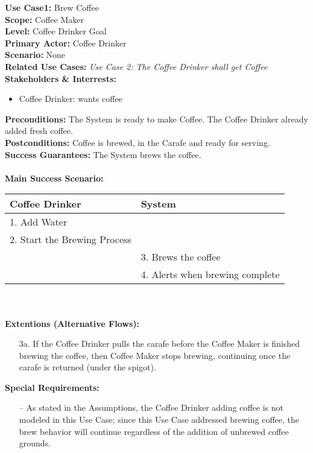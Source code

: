 \documentclass[letterpaper]{article}
\begin{document}
\noindent
\textbf{Use Case1: }Brew Coffee\\
\textbf{Scope: }Coffee Maker\\
\textbf{Level: }Coffee Drinker Goal\\
\textbf{Primary Actor: }Coffee Drinker\\
\textbf{Scenario: }None\\
\textbf{Related Use Cases: }\textit{Use Case 2:  The Coffee Drinker
shall get Coffee}\\
\textbf{Stakeholders \& Interrests: }
\begin{itemize}
\item Coffee Drinker: wants coffee
\end{itemize}
\textbf{Preconditions: }The System is ready to make Coffee.  The
Coffee Drinker already added fresh coffee.\\
\textbf{Postconditions: }Coffee is brewed, in the Carafe and ready for
serving.\\
\textbf{Success Guarantees: }The System brews the coffee.\\\\
\textbf{Main Success Scenario: }\\
\begin{tabular}{|p{5.75cm}|p{5.75cm}|}\hline
\textbf{Coffee Drinker} & \textbf{System}\\\hline
1.  Add Water & \\\hline
2.  Start the Brewing Process &\\\hline
& 3. Brews the coffee\\\hline
& 4. Alerts when brewing complete\\\hline
\end{tabular}\\\\
\textbf{Extentions (Alternative Flows): }
\begin{itemize}
\item[3a.]
If the Coffee Drinker pulls the carafe before the Coffee Maker
is finished brewing the coffee, then Coffee Maker stops brewing,
continuing once the carafe is returned (under the spigot).
\end{itemize}
\textbf{Special Requirements:  }
\begin{itemize}
\item [--]As stated in the Assumptions, the Coffee Drinker adding
coffee
is not modeled in this Use Case; since this Use Case addressed brewing
coffee, the brew behavior will continue regardless of the addition of
unbrewed coffee grounds.
\end{itemize}
\end{document}
